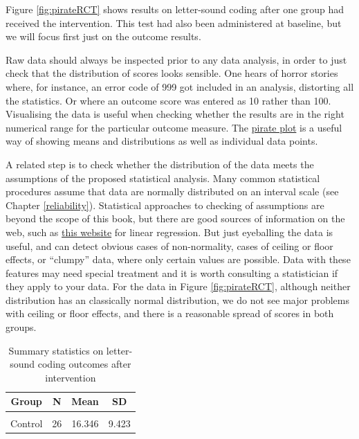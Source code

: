 \documentclass{krantz}
\begin{document}
Figure \ref{fig:pirateRCT} shows results on letter-sound coding after one group had received the intervention. This test had also been administered at baseline, but we will focus first just on the outcome results.

Raw data should always be inspected prior to any data analysis, in order to just check that the distribution of scores looks sensible. One hears of horror stories where, for instance, an error code of 999 got included in an analysis, distorting all the statistics. Or where an outcome score was entered as 10 rather than 100. Visualising the data is useful when checking whether the results are in the right numerical range for the particular outcome measure. The \href{https://www.psychologicalscience.org/observer/yarrr-the-pirates-guide-to-r}{pirate plot} is a useful way of showing means and distributions as well as individual data points.

A related step is to check whether the distribution of the data meets the assumptions of the proposed statistical analysis. Many common statistical procedures assume that data are normally distributed on an interval scale (see Chapter \ref{reliability}). Statistical approaches to checking of assumptions are beyond the scope of this book, but there are good sources of information on the web, such as \href{http://www.sthda.com/english/articles/39-regression-model-diagnostics/161-linear-regression-assumptions-and-diagnostics-in-r-essentials/}{this website} for linear regression. But just eyeballing the data is useful, and can detect obvious cases of non-normality, cases of ceiling or floor effects, or ``clumpy'' data, where only certain values are possible. Data with these features may need special treatment and it is worth consulting a statistician if they apply to your data. For the data in Figure \ref{fig:pirateRCT}, although neither distribution has an classically normal distribution, we do not see major problems with ceiling or floor effects, and there is a reasonable spread of scores in both groups.\\

\begin{table}

\caption{\label{tab:table2gp}Summary statistics on letter-sound coding outcomes after intervention}
\centering
\begin{tabular}[t]{cccc}
\toprule
Group & N & Mean & SD\\
\midrule
\cellcolor{gray!6}{Intervention} & \cellcolor{gray!6}{28} & \cellcolor{gray!6}{22.286} & \cellcolor{gray!6}{7.282}\\
Control & 26 & 16.346 & 9.423\\
\bottomrule
\end{tabular}
\end{table}
\end{document}
